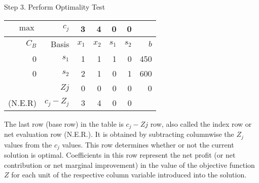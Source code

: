 \begin{frame}{Step 3. Perform Optimality Test}{}
  {\centering
    \begin{tabular}{rrrrrrr}
      \toprule
      $\max$& $c_j$  &3 &4 &0 &0 & \\
      \midrule
      $C_B$ &Basis&$x_1$&$x_2$&$s_1$&$s_2$&$b$\\
      \midrule
      0&$s_1$&1&1&1&0&450\\
      0&$s_2$&2&1&0&1&600\\
      \midrule
      &$Zj$&0&0&0&0&0\\
      (N.E.R)&$c_j - Z_j$&3&4&0&0&\\
      \bottomrule
    \end{tabular}
    \par}

  The last row (base row) in the table is $c_j - Zj$ row, also called the index row or net evaluation row (N.E.R.). It is obtained by \alert{subtracting columnwise the $Z_j$ values from the $c_j$ values. This row determines whether or not the current solution is optimal}. Coefficients in this row represent the net profit (or net contribution or net marginal improvement) in the value of the objective function $Z$ for each unit of the respective column variable introduced into the solution.
\end{frame}


